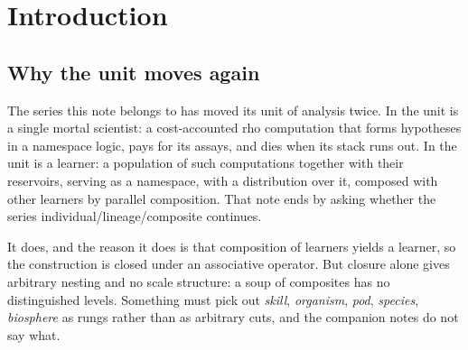 \documentclass[11pt]{article}
\theoremstyle{plain}
\theoremstyle{definition}
\theoremstyle{remark}
\begin{document}
\begin{abstract}
Fourth, and this is the note's answer to a question the companion notes
leave open, \emph{error correction is what individuates}. Transposing the
crossover of \cite{compaut} onto the cost-weighted engine graph, with name
collision as the error channel and re-rooting as repair, a region may close
over its namespace --- merge, in the sense of \cite[\S8]{compose} --- iff
its isoperimetric ratio clears a threshold set by $\varepsilon\theta/\rho$.
Polynomial growth then gives a finite critical radius and a hierarchy of
nested individuals; expansion gives individuals exponentially larger for
the same parameters. The structural form of the same criterion is partial
closure: an individual owns its internal media and does not own its
boundary media, since retransmission requires the power to name what
failed. Total closure would be fatal, and internal complexity is not
merely permitted but purchased --- integration depth is bought with
reliability, and reliability is available only on a medium one can
repair.
\end{abstract}

\tableofcontents

\section{Introduction}

\subsection{Why the unit moves again}

The series this note belongs to has moved its unit of analysis twice. In
\cite{scientist} the unit is a single mortal scientist: a cost-accounted
rho computation that forms hypotheses in a namespace logic, pays for its
assays, and dies when its stack runs out. In \cite{compose} the unit is a
learner: a population of such computations together with their reservoirs,
serving as a namespace, with a distribution over it, composed with other
learners by parallel composition. That note ends by asking whether the
series individual/lineage/composite continues.

It does, and the reason it does is that composition of learners yields a
learner, so the construction is closed under an associative operator. But
closure alone gives arbitrary nesting and no scale structure: a soup of
composites has no distinguished levels. Something must pick out
\emph{skill}, \emph{organism}, \emph{pod}, \emph{species}, \emph{biosphere}
as rungs rather than as arbitrary cuts, and the companion notes do not say
what.
\end{document}
